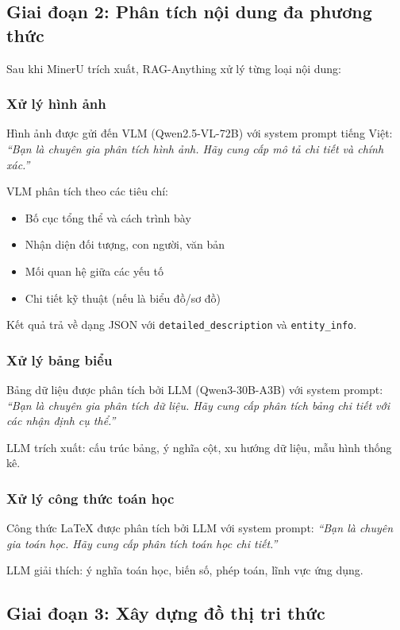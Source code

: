 \documentclass[12pt,a4paper]{article}
\begin{document}
\subsection{Giai đoạn 2: Phân tích nội dung đa phương thức}

Sau khi MinerU trích xuất, RAG-Anything xử lý từng loại nội dung:

\subsubsection{Xử lý hình ảnh}

Hình ảnh được gửi đến VLM (Qwen2.5-VL-72B) với system prompt tiếng Việt: \textit{``Bạn là chuyên gia phân tích hình ảnh. Hãy cung cấp mô tả chi tiết và chính xác.''}

VLM phân tích theo các tiêu chí:
\begin{itemize}
  \item Bố cục tổng thể và cách trình bày
  \item Nhận diện đối tượng, con người, văn bản
  \item Mối quan hệ giữa các yếu tố
  \item Chi tiết kỹ thuật (nếu là biểu đồ/sơ đồ)
\end{itemize}

Kết quả trả về dạng JSON với \texttt{detailed\_description} và \texttt{entity\_info}.

\subsubsection{Xử lý bảng biểu}

Bảng dữ liệu được phân tích bởi LLM (Qwen3-30B-A3B) với system prompt: \textit{``Bạn là chuyên gia phân tích dữ liệu. Hãy cung cấp phân tích bảng chi tiết với các nhận định cụ thể.''}

LLM trích xuất: cấu trúc bảng, ý nghĩa cột, xu hướng dữ liệu, mẫu hình thống kê.

\subsubsection{Xử lý công thức toán học}

Công thức LaTeX được phân tích bởi LLM với system prompt: \textit{``Bạn là chuyên gia toán học. Hãy cung cấp phân tích toán học chi tiết.''}

LLM giải thích: ý nghĩa toán học, biến số, phép toán, lĩnh vực ứng dụng.

\subsection{Giai đoạn 3: Xây dựng đồ thị tri thức}
\end{document}
